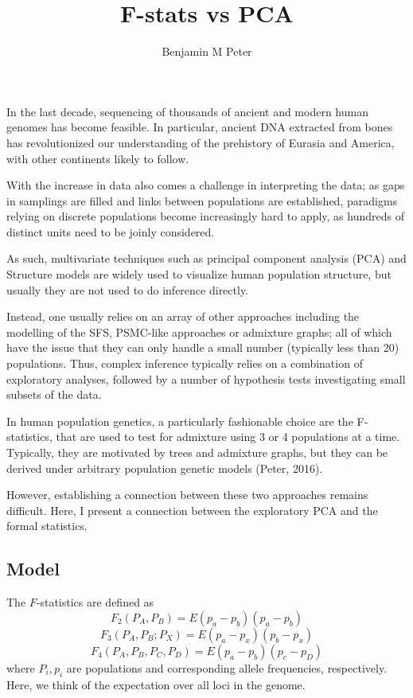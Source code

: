 \documentclass[9pt,twocolumn,twoside,lineno]{pnas-new}
\title{F-stats vs PCA}
\author[a,1]{Benjamin M Peter}
\affil[a]{Affiliation One}
\begin{document}
\maketitle
\thispagestyle{firststyle}

In the last decade, sequencing of thousands of ancient and modern human genomes has become feasible. In particular, ancient DNA extracted from bones has revolutionized our understanding of the prehistory of Eurasia and America,  with other continents likely to follow. 

With the increase in data also comes a challenge in interpreting the data; as gaps in samplings are filled and links between populations are established, paradigms relying on discrete populations become increasingly hard to apply, as hundreds of distinct units need to be joinly considered. 

As such, multivariate techniques such as principal component analysis (PCA) and Structure models are widely used to visualize human population structure, but usually they are not used to do inference directly.

Instead, one usually relies on an array of other approaches including the modelling of the SFS, PSMC-like approaches or admixture graphs; all of which have the issue that they can only handle a small number (typically less than 20) populations. Thus, complex inference typically relies on a combination of exploratory analyses, followed by a number of hypothesis tests investigating small subsets of the data. 

In human population genetics, a particularly fashionable choice are the F-statistics, that are used to test for admixture using 3 or 4 populations at a time. Typically, they are motivated by trees and admixture graphs, but they can be derived under arbitrary population genetic models (Peter, 2016).

However, establishing a connection between these two approaches remains difficult. 
Here, I present a connection between the exploratory PCA and the formal statistics. 

\subsection*{Model}
The $F$-statistics are defined as 
$$F_2(P_A, P_B) = E(p_a - p_b)(p_a - p_b)$$
$$F_3(P_A, P_B; P_X) = E(p_a - p_x)(p_b - p_x)$$
$$F_4(P_A, P_B, P_C, P_D) = E(p_a - p_b)(p_c - p_D)$$
where $P_i, p_i$ are populations and corresponding allele frequencies, respectively. Here, we think of the expectation over all loci in the genome.
\end{document}
